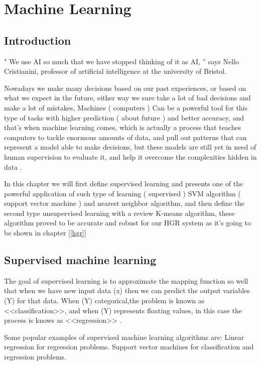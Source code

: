
\chapter{Machine Learning} \label{ML}

\section{Introduction}

" We use AI so much that we have stopped thinking of it as AI, ”  says Nello Cristianini,  professor of artificial  intelligence at the university of Bristol.

Nowadays we make many decisions based on our past experiences,  or based on what we expect in the future, either way we sure take a lot of bad decisions and make a lot of mistakes, Machines ( computers ) Can be a powerful tool for this type of tasks with higher prediction ( about future ) and better accuracy, and that's when machine learning comes, which is actually a process  that teaches computers to tackle enormous amounts of data, and pull out patterns that can represent a model able to  make decisions, but these models are still yet in need of human supervision to evaluate it, and help it overcome the complexities hidden in data .

In this chapter we will first define supervised learning and presents one of the powerful application of such type of learning ( supervised ) SVM algorithm ( support vector machine )  and nearest neighbor algorithm, and then define the second type unsupervised learning   with a review K-means algorithm, these algorithm  proved  to be accurate and robust  for our HGR system as it's going to be shown in  chapter  [\ref{hgr}]

\section{Supervised machine learning}

The goal of supervised learning is to approximate the mapping function so well that when we have new input data (x) then we can predict the output variables (Y) for that data. When (Y) categorical,the problem is known as <<classification>>, and when (Y) represents floating values, in this case the process is knows as <<regression>> .

Some popular examples of supervised machine learning algorithms are:
Linear regression for regression problems.
Support vector machines for classification and regression problems.

